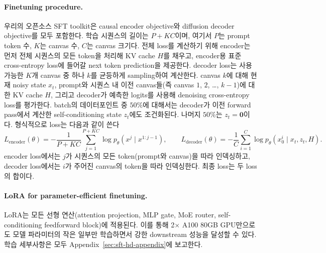 \documentclass[11pt, a4paper, logo, copyright, gdm]{google}
\begin{document}
\paragraph{Finetuning procedure.} 우리의 오픈소스 SFT toolkit은 causal encoder objective와 diffusion decoder objective를 모두 포함한다. 학습 시퀀스의 길이는 $P+KC$이며, 여기서 $P$는 prompt token 수, $K$는 canvas 수, $C$는 canvas 크기다. 전체 loss를 계산하기 위해 encoder는 먼저 전체 시퀀스의 모든 token을 처리해 KV cache $H$를 채우고, encoder용 표준 cross-entropy loss에 들어갈 next token prediction을 제공한다. decoder loss는 사용 가능한 $K$개 canvas 중 하나 $k$를 균등하게 sampling하여 계산한다. canvas $k$에 대해 현재 noisy state $x_t$, prompt와 시퀀스 내 이전 canvas들(즉 canvas $1$, $2$, \ldots, $k-1$)에 대한 KV cache $H$, 그리고 decoder가 예측한 logits를 사용해 denoising cross-entropy loss를 평가한다. batch의 데이터포인트 중 $50\%$에 대해서는 decoder가 이전 forward pass에서 계산한 self-conditioning state $z_t$에도 조건화된다. 나머지 $50\%$는 $z_t = \textbf{0}$이다.
형식적으로 loss는 다음과 같이 쓴다
\begin{equation}
   L_{\text{encoder}}(\theta) = - \frac{1}{P+KC} \sum_{j=1}^{P+KC} \log p_\theta(x^j \mid x^{1:j-1}) , \quad  \quad L_{\text{decoder}}(\theta) = - \frac{1}{C} \sum_{i=1}^C \log p_\theta(x_0^{i} \mid x_t, z_t, H).
\end{equation}
encoder loss에서는 $j$가 시퀀스의 모든 token(prompt와 canvas)을 따라 인덱싱하고, decoder loss에서는 $i$가 주어진 canvas의 token을 따라 인덱싱한다. 최종 loss는 두 loss의 합이다.

\paragraph{LoRA for parameter-efficient finetuning.} LoRA는 모든 선형 연산(attention projection, MLP gate, MoE router, self-conditioning feedforward block)에 적용된다. 이를 통해 2$\times$ A100 80GB GPU만으로도 모델 파라미터의 작은 일부만 학습하면서 강한 downstream 성능을 달성할 수 있다. 학습 세부사항은 모두 Appendix~\ref{sec:sft-hd-appendix}에 보고한다.
\end{document}
